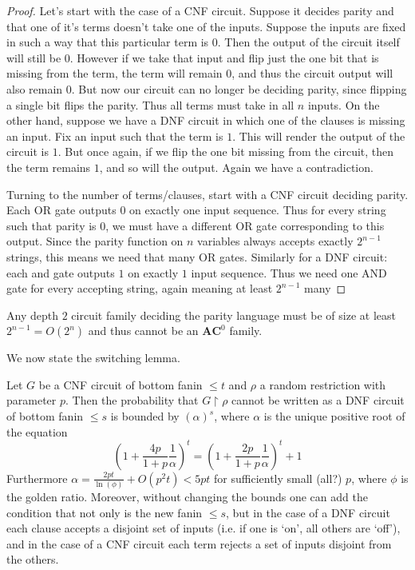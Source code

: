 \begin{proof}
	Let's start with the case of a CNF circuit. Suppose it decides parity and that one of it's terms doesn't take one of the inputs. Suppose the inputs are fixed in such a way that this particular term is $0$. Then the output of the circuit itself will still be $0$. However if we take that input and flip just the one bit that is missing from the term, the term will remain $0$, and thus the circuit output will also remain $0$. But now our circuit can no longer be deciding parity, since flipping a single bit flips the parity. Thus all terms must take in all $n$ inputs. On the other hand, suppose we have a DNF circuit in which one of the clauses is missing an input. Fix an input such that the term is $1$. This will render the output of the circuit is $1$. But once again, if we flip the one bit missing from the circuit, then the term remains $1$, and so will the output. Again we have a contradiction. \par 
	Turning to the number of terms/clauses, start with a CNF circuit deciding parity. Each OR gate outputs $0$ on exactly one input sequence. Thus for every string such that parity is $0$, we must have a different OR gate corresponding to this output. Since the parity function on $n$ variables always accepts exactly $2^{n-1}$ strings, this means we need that many OR gates. Similarly for a DNF circuit: each and gate outputs $1$ on exactly $1$ input sequence. Thus we need one AND gate for every accepting string, again meaning at least $2^{n-1}$ many
\end{proof}
\begin{corollary}
	Any depth $2$ circuit family deciding the parity language must be of size at least $2^{n-1} = O(2^n)$ and thus cannot be an $\bm{AC}^0$ family. 
\end{corollary}
We now state the switching lemma. 
\begin{theorem}
	Let $G$ be a CNF circuit of bottom fanin $\leq t$ and $\rho$ a random restriction with parameter $p$. Then the probability that $G \restriction \rho$ cannot be written as a DNF circuit of bottom fanin $\leq s$ is bounded by $(\alpha)^s$, where $\alpha$ is the unique positive root of the equation
	\[ (1+\frac{4p}{1+p}\frac{1}{\alpha})^t = (1+\frac{2p}{1+p}\frac{1}{\alpha})^t+1 \]
Furthermore $\alpha = \frac{2pt}{\ln(\phi)} + O(p^2t) < 5pt$ for sufficiently small (all?) $p$, where $\phi$ is the golden ratio. Moreover, without changing the bounds one can add the condition that not only is the new fanin $\leq s$, but in the case of a DNF circuit each clause accepts a disjoint set of inputs (i.e. if one is `on', all others are `off'), and in the case of a CNF circuit each term rejects a set of inputs disjoint from the others.  
\end{theorem}

